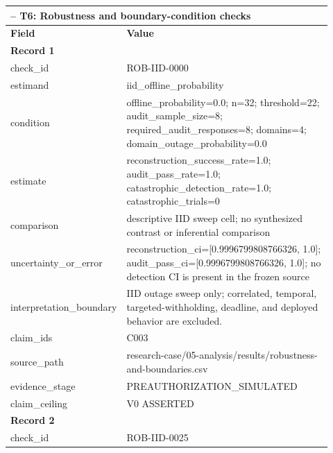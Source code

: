 \begingroup
\setlength{\tabcolsep}{2pt}
\small\sloppy
\begin{longtable}{|p{0.24\linewidth}|p{0.68\linewidth}|}
\hline
\multicolumn{2}{|l|}{\KeystoneDraftTableNotice{} -- T6: Robustness and boundary-condition checks} \\ \hline
\textbf{Field} & \textbf{Value} \\ \hline
\multicolumn{2}{|l|}{\textbf{Record 1}} \\ \hline
check\_\allowbreak{}id & ROB-IID-0000 \\ \hline
estimand & iid\_\allowbreak{}offline\_\allowbreak{}probability \\ \hline
condition & offline\_\allowbreak{}probability=0.0;\allowbreak{} n=32;\allowbreak{} threshold=22;\allowbreak{} audit\_\allowbreak{}sample\_\allowbreak{}size=8;\allowbreak{} required\_\allowbreak{}audit\_\allowbreak{}responses=8;\allowbreak{} domains=4;\allowbreak{} domain\_\allowbreak{}outage\_\allowbreak{}probability=0.0 \\ \hline
estimate & reconstruction\_\allowbreak{}success\_\allowbreak{}rate=1.0;\allowbreak{} audit\_\allowbreak{}pass\_\allowbreak{}rate=1.0;\allowbreak{} catastrophic\_\allowbreak{}detection\_\allowbreak{}rate=1.0;\allowbreak{} catastrophic\_\allowbreak{}trials=0 \\ \hline
comparison & descriptive IID sweep cell;\allowbreak{} no synthesized contrast or inferential comparison \\ \hline
uncertainty\_\allowbreak{}or\_\allowbreak{}error & reconstruction\_\allowbreak{}ci=[0.9996799808766326, 1.0];\allowbreak{} audit\_\allowbreak{}pass\_\allowbreak{}ci=[0.9996799808766326, 1.0];\allowbreak{} no detection CI is present in the frozen source \\ \hline
interpretation\_\allowbreak{}boundary & IID outage sweep only;\allowbreak{} correlated, temporal, targeted-withholding, deadline, and deployed behavior are excluded. \\ \hline
claim\_\allowbreak{}ids & C003 \\ \hline
source\_\allowbreak{}path & research-case/05-analysis/results/robustness-and-boundaries.csv \\ \hline
evidence\_\allowbreak{}stage & PREAUTHORIZATION\_\allowbreak{}SIMULATED \\ \hline
claim\_\allowbreak{}ceiling & V0 ASSERTED \\ \hline
\multicolumn{2}{|l|}{\textbf{Record 2}} \\ \hline
check\_\allowbreak{}id & ROB-IID-0025 \\ \hline

\end{longtable}
